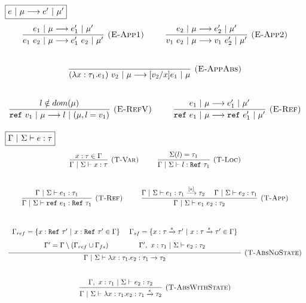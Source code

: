 \documentclass{llncs}
\newcommand{\reftt}{\mathtt{ref}~}
\newcommand{\Reftt}{\mathtt{Ref}~}
\begin{document}
$\fbox{$e~|~\mu \longrightarrow e'~|~\mu'$}$
\[
\begin{array}{c}
\infer[\textsc{(E-App1)}]
  {e_1~e_2~|~\mu \longrightarrow e_1'~e_2~|~\mu'}
  {e_1~|~\mu \longrightarrow e_1'~|~\mu'} 
~~~~~~~~
\infer[\textsc{(E-App2)}]
  {v_1~e_2~|~\mu \longrightarrow v_1~e_2'~|~\mu'}
  {e_2~|~\mu \longrightarrow e_2'~|~\mu'}\\[5ex]

\infer[\textsc{(E-AppAbs)}]
  {(\lambda x : \tau_1.e_1)~v_2~|~\mu \longrightarrow [v_2/x]e_1~|~\mu}
  { }\\[5ex]

\infer[\textsc{(E-RefV)}]
  {\reftt v_1~|~\mu \longrightarrow l ~|~(\mu, l = v_1)}
  {l \notin dom(\mu)}
~~~~~~~~
\infer[\textsc{(E-Ref)}]
  {\reftt e_1~|~\mu \longrightarrow \reftt e_1'~|~\mu'}
  {e_1~|~\mu \longrightarrow e_1'~|~\mu'}
\end{array}
\]

$\fbox{$\Gamma~|~\Sigma \vdash e : \tau$}$
\[
\begin{array}{c}
\infer[\textsc{(T-Var)}]
  {\Gamma~|~\Sigma \vdash x : \tau}
  {x : \tau \in \Gamma}
~~~~~~~~  
\infer[\textsc{(T-Loc)}]
  {\Gamma~|~\Sigma \vdash l : \Reftt \tau_1}
  {\Sigma(l) = \tau_1}\\[5ex]

\infer[\textsc{(T-Ref)}]
  {\Gamma~|~\Sigma \vdash \reftt e_1 : \Reftt \tau_1}
  {\Gamma~|~\Sigma \vdash e_1 : \tau_1}
~~~~~~~~
\infer[\textsc{(T-App)}]
  {\Gamma~|~\Sigma \vdash e_1~e_2 : \tau_2}
  {\Gamma~|~\Sigma \vdash e_1 : \tau_1 \xrightarrow{[s]} \tau_2
  ~~~~ \Gamma~|~\Sigma \vdash e_2 : \tau_1}\\[5ex]

\infer[\textsc{(T-AbsNoState)}]
  {\Gamma~|~\Sigma \vdash \lambda x : \tau_1.e_2 : \tau_1 \rightarrow \tau_2}
  {\def\arraystretch{1.6}
  \begin{array}{c}
\Gamma_{ref} = \{x : \Reftt \tau'~|~ x : \Reftt \tau' \in \Gamma\}~~~~
\Gamma_{sf} = \{ x : \tau \xrightarrow{s} \tau'~|~x : \tau \xrightarrow{s} \tau' \in \Gamma \} \\
\Gamma' = \Gamma \setminus (\Gamma_{ref} \cup \Gamma_{fs})~~~~~~~~~~~~~\Gamma',~x : \tau_1~|~\Sigma \vdash e_2 : \tau_2
  \end{array}}\\[5ex]

  

\infer[\textsc{(T-AbsWithState)}]
  {\Gamma~|~\Sigma \vdash \lambda x : \tau_1.e_2 : \tau_1 \xrightarrow{s} \tau_2}
  {\Gamma,~x : \tau_1~|~\Sigma \vdash e_2 : \tau_2}\\[5ex]

\end{array}
\]
\end{document}
